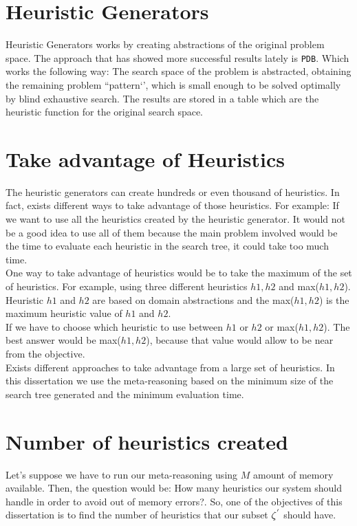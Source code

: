 \section{Heuristic Generators}
Heuristic Generators works by creating abstractions of the original problem space. The approach that has showed more successful results lately is \texttt{PDB}. Which works the following way: The search space of the problem is abstracted, obtaining the remaining problem ``pattern‘’, which is small enough to be solved optimally by blind exhaustive search. The results are stored in a table which are the heuristic function for the original search space.\\

\section{Take advantage of Heuristics}
The heuristic generators can create hundreds or even thousand of heuristics. In fact, exists different ways to take advantage of those heuristics. For example: If we want to use all the heuristics created by the heuristic generator. It would not be a good idea to use all of them because the main problem involved would be the time to evaluate each heuristic in the search tree, it could take too much time. \\

One way to take advantage of heuristics would be to take the maximum of the set of heuristics. For example, using three different heuristics $h1, h2$ and max($h1, h2$). Heuristic $h1$ and $h2$ are based on domain abstractions and the max($h1, h2$) is the maximum heuristic value of $h1$ and $h2$. \\

If we have to choose which heuristic to use between $h1$ or $h2$ or max($h1, h2$). The best answer would be max($h1, h2$), because that value would allow to be near from the objective.\\

Exists different approaches to take advantage from a large set of heuristics. In this dissertation we use the meta-reasoning based on the minimum size of the search tree generated and the minimum evaluation time. \\

\section{Number of heuristics created}
Let's suppose we have to run our meta-reasoning using $M$ amount of memory available. Then, the question would be: How many heuristics our system should handle in order to avoid out of memory errors?. So, one of the objectives of this dissertation is to find the number of heuristics that our subset $\zeta\sp{'}$ should have.\\
 

